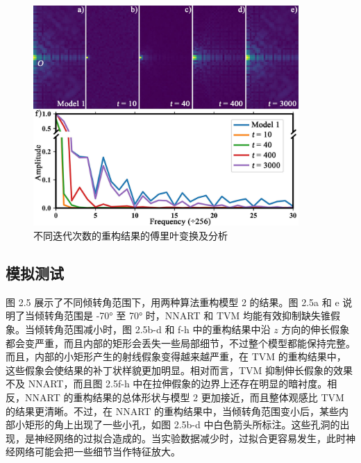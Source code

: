 \begin{figure}[htbp]
	\vspace{\baselineskip}
	\centering
	\includegraphics[width=0.9\textwidth]{../3.4/34}
	\caption{不同迭代次数的重构结果的傅里叶变换及分析}\label{fig:34}
	\song{}
\end{figure}

\subsection{模拟测试}
图 2.5 展示了不同倾转角范围下，用两种算法重构模型 2 的结果。图 2.5a 和 e 说明了当倾转角范围是 -70° 至 70° 时，NNART 和 TVM 均能有效抑制缺失锥假象。当倾转角范围减小时，图 2.5b-d 和 f-h 中的重构结果中沿 $z$ 方向的伸长假象都会变严重，而且内部的矩形会丢失一些局部细节，不过整个模型都能保持完整。而且，内部的小矩形产生的射线假象变得越来越严重，在 TVM 的重构结果中，这些假象会使结果的补丁状样貌更加明显。相对而言，TVM 抑制伸长假象的效果不及 NNART，而且图 2.5f-h 中在拉伸假象的边界上还存在明显的暗衬度。相反，NNART 的重构结果的总体形状与模型 2 更加接近，而且整体观感比 TVM 的结果更清晰。不过，在 NNART 的重构结果中，当倾转角范围变小后，某些内部小矩形的角上出现了一些小孔，如图 2.5b-d 中白色箭头所标注。这些孔洞的出现，是神经网络的过拟合造成的。当实验数据减少时，过拟合更容易发生，此时神经网络可能会把一些细节当作特征放大。


